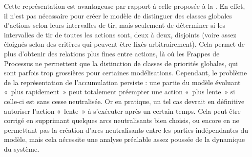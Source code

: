 Cette représentation est avantageuse par rapport à celle proposée à la
.
En effet, il n'est pas nécessaire pour créer le modèle
de distinguer des classes globales d'actions selon leurs
intervalles de tir, mais seulement de déterminer si les intervalles de tir de toutes les actions
sont, deux à deux, disjoints (voire assez éloignés selon des critères qui peuvent être
fixés arbitrairement).
Cela permet de plus d'obtenir des relations plus fines entre actions,
là où les Frappes de Processus ne permettent que la distinction de classes de priorités
globales, qui sont parfois trop grossières pour certaines modélisations.
Cependant, le problème de la représentation de l'accumulation persiste :
une partie du modèle évoluant «~plus rapidement~» peut totalement préempter une
action «~plus lente~» si celle-ci est sans cesse neutralisée.
Or en pratique, un tel cas devrait en définitive autoriser l'action «~lente~» à s'exécuter
après un certain temps.
Cela peut être corrigé en supprimant quelques arcs neutralisants bien choisis,
ou encore en ne permettant pas la création d'arcs neutralisants entre les parties indépendantes
du modèle, mais cela nécessite une analyse préalable assez poussée de la dynamique
du système.
